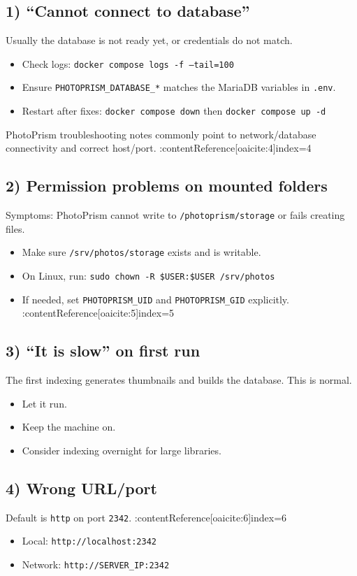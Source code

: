\subsection{1) ``Cannot connect to database''}
Usually the database is not ready yet, or credentials do not match.
\begin{itemize}[leftmargin=*]
  \item Check logs: \texttt{docker compose logs -f --tail=100}
  \item Ensure \texttt{PHOTOPRISM\_DATABASE\_*} matches the MariaDB variables in \texttt{.env}.
  \item Restart after fixes: \texttt{docker compose down} then \texttt{docker compose up -d}
\end{itemize}
PhotoPrism troubleshooting notes commonly point to network/database connectivity and correct host/port. :contentReference[oaicite:4]{index=4}

\subsection{2) Permission problems on mounted folders}
Symptoms: PhotoPrism cannot write to \texttt{/photoprism/storage} or fails creating files.
\begin{itemize}[leftmargin=*]
  \item Make sure \texttt{/srv/photos/storage} exists and is writable.
  \item On Linux, run: \texttt{sudo chown -R \$USER:\$USER /srv/photos}
  \item If needed, set \texttt{PHOTOPRISM\_UID} and \texttt{PHOTOPRISM\_GID} explicitly. :contentReference[oaicite:5]{index=5}
\end{itemize}

\subsection{3) ``It is slow'' on first run}
The first indexing generates thumbnails and builds the database. This is normal.
\begin{itemize}[leftmargin=*]
  \item Let it run.
  \item Keep the machine on.
  \item Consider indexing overnight for large libraries.
\end{itemize}

\subsection{4) Wrong URL/port}
Default is \texttt{http} on port \texttt{2342}. :contentReference[oaicite:6]{index=6}
\begin{itemize}[leftmargin=*]
  \item Local: \texttt{http://localhost:2342}
  \item Network: \texttt{http://SERVER\_IP:2342}
\end{itemize}

